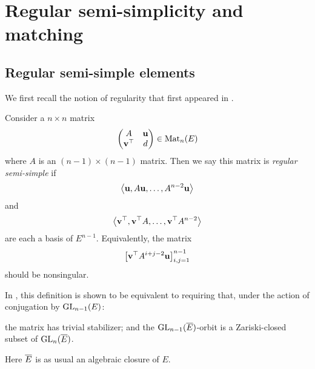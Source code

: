 \section{Regular semi-simplicity and matching}
\label{ch:rs_matching}

\subsection{Regular semi-simple elements}
We first recall the notion of regularity
that first appeared in \cite[\S6]{ref:multoneconj}.

\begin{definition}
  \label{def:rs}
  Consider a $n \times n$ matrix
  \[ \begin{pmatrix} A & \mathbf u \\ \mathbf v^\top & d \end{pmatrix} \in \operatorname{Mat}_n(E) \]
  where $A$ is an $(n-1) \times (n-1)$ matrix.
  Then we say this matrix is \emph{regular semi-simple} if
  \[ \left< \mathbf u, A\mathbf u, \dots, A^{n-2}\mathbf u \right> \]
  and \[ \left< \mathbf v^\top, \mathbf v^\top A, \dots, \mathbf v^\top A^{n-2} \right> \]
  are each a basis of $E^{n-1}$.
  Equivalently, the matrix
  \[ \left[ \mathbf v^\top A^{i+j-2} \mathbf u \right]_{i,j=1}^{n-1} \]
  should be nonsingular.
\end{definition}

\begin{remark}
  In \cite[Theorem 6.1]{ref:multoneconj}, this definition is shown to be equivalent to
  requiring that, under the action of conjugation by $\operatorname{GL}_{n-1}(E)$:
  \begin{itemize}
  \ii the matrix has trivial stabilizer; and
  \ii the $\operatorname{GL}_{n-1}(\overline E)$-orbit is a Zariski-closed subset of $\operatorname{GL}_n(\overline E)$.
  \end{itemize}
  Here $\overline E$ is as usual an algebraic closure of $E$.
\end{remark}

